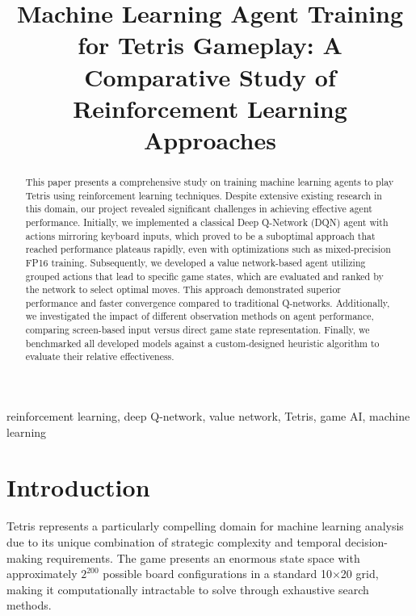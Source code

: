 \documentclass[conference]{IEEEtran}
\begin{document}
\title{Machine Learning Agent Training for Tetris Gameplay: A Comparative Study of Reinforcement Learning Approaches}

\author{
\and
{}
}

\maketitle

\begin{abstract}
This paper presents a comprehensive study on training machine learning agents to play Tetris using reinforcement learning techniques. Despite extensive existing research in this domain, our project revealed significant challenges in achieving effective agent performance. Initially, we implemented a classical Deep Q-Network (DQN) agent with actions mirroring keyboard inputs, which proved to be a suboptimal approach that reached performance plateaus rapidly, even with optimizations such as mixed-precision FP16 training. Subsequently, we developed a value network-based agent utilizing grouped actions that lead to specific game states, which are evaluated and ranked by the network to select optimal moves. This approach demonstrated superior performance and faster convergence compared to traditional Q-networks. Additionally, we investigated the impact of different observation methods on agent performance, comparing screen-based input versus direct game state representation. Finally, we benchmarked all developed models against a custom-designed heuristic algorithm to evaluate their relative effectiveness.
\end{abstract}

\begin{IEEEkeywords}
reinforcement learning, deep Q-network, value network, Tetris, game AI, machine learning
\end{IEEEkeywords}

\section{Introduction}

Tetris represents a particularly compelling domain for machine learning analysis due to its unique combination of strategic complexity and temporal decision-making requirements. The game presents an enormous state space with approximately $2^{200}$ possible board configurations in a standard 10×20 grid, making it computationally intractable to solve through exhaustive search methods.
\end{document}
